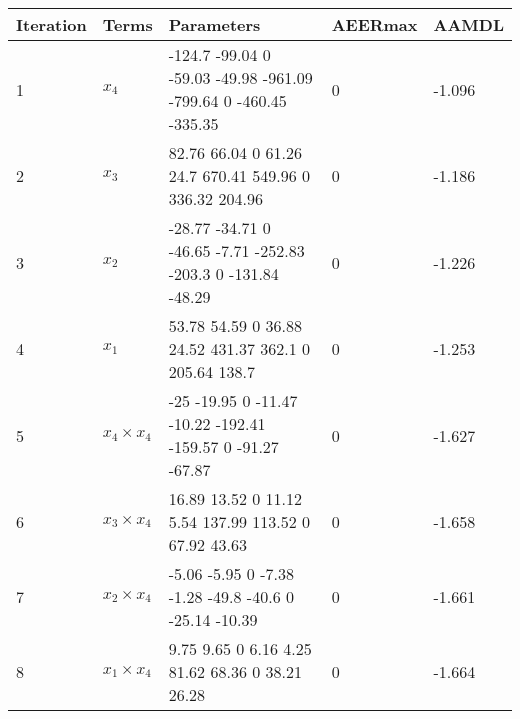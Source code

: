 \begin{tabular}{lllll}
Iteration & Terms & Parameters & AEERmax & AAMDL \\ 
\hline 
1 & $x_4$ & -124.7        -99.04             0        -59.03        -49.98       -961.09       -799.64             0       -460.45       -335.35 & 0 & -1.096 \\ 
2 & $x_3$ & 82.76         66.04             0         61.26          24.7        670.41        549.96             0        336.32        204.96 & 0 & -1.186 \\ 
3 & $x_2$ & -28.77        -34.71             0        -46.65         -7.71       -252.83        -203.3             0       -131.84        -48.29 & 0 & -1.226 \\ 
4 & $x_1$ & 53.78         54.59             0         36.88         24.52        431.37         362.1             0        205.64         138.7 & 0 & -1.253 \\ 
5 & $x_4 \times x_4$ & -25        -19.95             0        -11.47        -10.22       -192.41       -159.57             0        -91.27        -67.87 & 0 & -1.627 \\ 
6 & $x_3 \times x_4$ & 16.89         13.52             0         11.12          5.54        137.99        113.52             0         67.92         43.63 & 0 & -1.658 \\ 
7 & $x_2 \times x_4$ & -5.06        -5.95            0        -7.38        -1.28        -49.8        -40.6            0       -25.14       -10.39 & 0 & -1.661 \\ 
8 & $x_1 \times x_4$ & 9.75         9.65            0         6.16         4.25        81.62        68.36            0        38.21        26.28 & 0 & -1.664 \\ 
\hline 
\end{tabular}